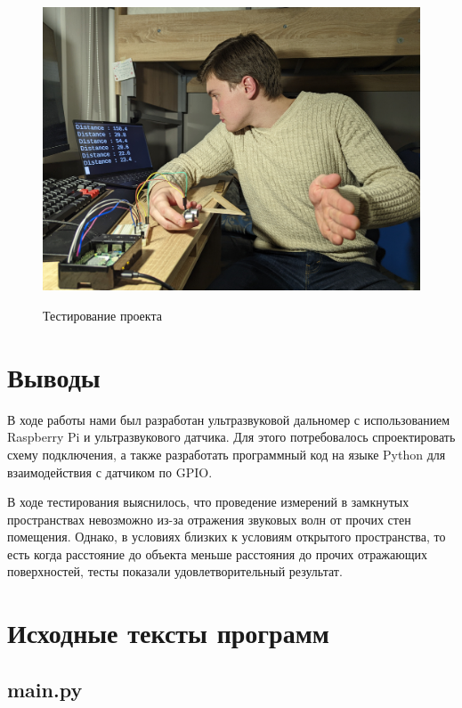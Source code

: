 \documentclass[a4paper, 14pt]{article}
\begin{document}
\begin{figure}[H]
	\centering
	\includegraphics[width=15cm]{screenshots/12.png}\\
	\caption{Тестирование проекта}
\end{figure}


\newpage
\section{Выводы}

В ходе работы нами был разработан ультразвуковой дальномер с использованием Raspberry Pi и ультразвукового датчика. Для этого потребовалось спроектировать схему подключения, а также разработать программный код на языке Python для взаимодействия с датчиком по GPIO.

В ходе тестирования выяснилось, что проведение измерений в замкнутых пространствах невозможно из-за отражения звуковых волн от прочих стен помещения. Однако, в условиях близких к условиям открытого пространства, то есть когда расстояние до объекта меньше расстояния до прочих отражающих поверхностей, тесты показали удовлетворительный результат.

\newpage
\section{Исходные тексты программ}

\subsection{main.py}
\normalsize
\inputminted[frame=single]{python}{../src/main.py}
\Large
\newpage
\end{document}
